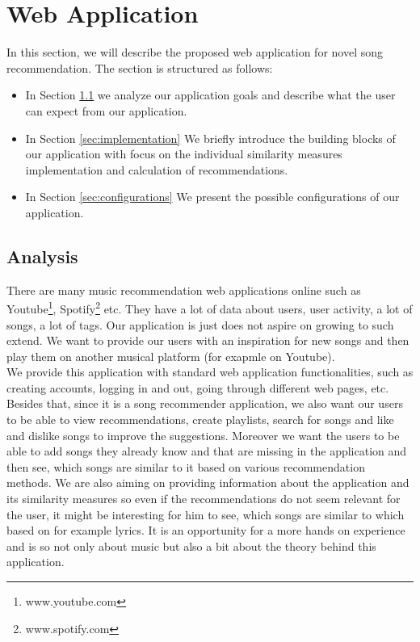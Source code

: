 \chapter{Web Application}\label{chap:web_app}

In this section, we will describe the proposed web application for novel song recommendation. The section is structured as follows: 
\begin{itemize}
    \item In Section \ref{sec:analysis} we analyze our application goals and describe what the user can expect from our application.
    \item In Section \ref{sec:implementation} We briefly introduce the building blocks of our application with focus on the individual similarity measures implementation and calculation of recommendations.
    \item In Section \ref{sec:configurations} We present the possible configurations of our application.
\end{itemize}

\section{Analysis}\label{sec:analysis}

There are many music recommendation web applications online such as Youtube\footnote{www.youtube.com}, Spotify\footnote{www.spotify.com} etc. They have a lot of data about users, user activity, a lot of songs, a lot of tags. Our application is just does not aspire on growing to such extend. We want to provide our users with an inspiration for new songs and then play them on another musical platform (for exapmle on Youtube). \\
We provide this application with standard web application functionalities, such as creating accounts, logging in and out, going through different web pages, etc. Besides that, since it is a song recommender application, we also want our users to be able to view recommendations, create playlists, search for songs and like and dislike songs to improve the suggestions. Moreover we want the users to be able to add songs they already know and that are missing in the application and then see, which songs are similar to it based on various recommendation methods. We are also aiming on providing information about the application and its similarity measures so even if the recommendations do not seem relevant for the user, it might be interesting for him to see, which songs are similar to which based on for example lyrics. It is an opportunity for a more hands on experience and is so not only about music but also a bit about the theory behind this application. \\

